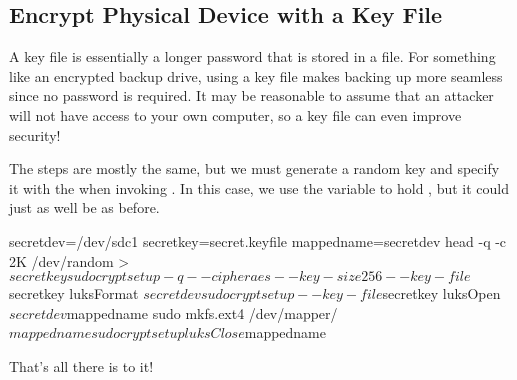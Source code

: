 

\subsection{Encrypt Physical Device with a Key File}

A key file is essentially a longer password that is stored in a file.
For something like an encrypted backup drive, using a key file makes backing up more seamless since no password is required.
It may be reasonable to assume that an attacker will not have access to your own computer, so a key file can even improve security!

The steps are mostly the same, but we must generate a random key and specify it with the  when invoking .
In this case, we use the variable  to hold , but it could just as well be  as before.

\begin{code}
secretdev=/dev/sdc1
secretkey=secret.keyfile
mappedname=secretdev
head -q -c 2K /dev/random > $secretkey
sudo cryptsetup -q --cipher aes --key-size 256 --key-file $secretkey luksFormat $secretdev
sudo cryptsetup --key-file $secretkey luksOpen $secretdev $mappedname
sudo mkfs.ext4 /dev/mapper/$mappedname
sudo cryptsetup luksClose $mappedname
\end{code}

That's all there is to it!






